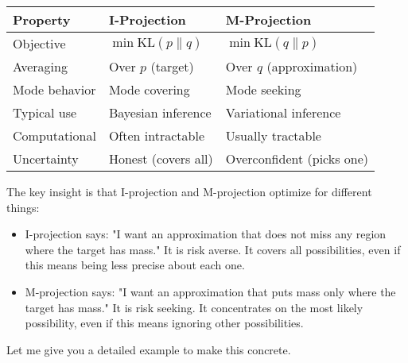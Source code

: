 \vspace{1em}

\begin{center}
\begin{tabular}{lll}
\toprule
Property & I-Projection & M-Projection \\
\midrule
Objective & $\min \text{KL}(p \| q)$ & $\min \text{KL}(q \| p)$ \\
Averaging & Over $p$ (target) & Over $q$ (approximation) \\
Mode behavior & Mode covering & Mode seeking \\
Typical use & Bayesian inference & Variational inference \\
Computational & Often intractable & Usually tractable \\
Uncertainty & Honest (covers all) & Overconfident (picks one) \\
\bottomrule
\end{tabular}
\end{center}

\vspace{1.5em}

The key insight is that I-projection and M-projection optimize for different things:

\begin{itemize}
\item I-projection says: "I want an approximation that does not miss any region where the target has mass." It is risk averse. It covers all possibilities, even if this means being less precise about each one.

\item M-projection says: "I want an approximation that puts mass only where the target has mass." It is risk seeking. It concentrates on the most likely possibility, even if this means ignoring other possibilities.
\end{itemize}

\vspace{2em}

Let me give you a detailed example to make this concrete.

\vspace{1.5em}

